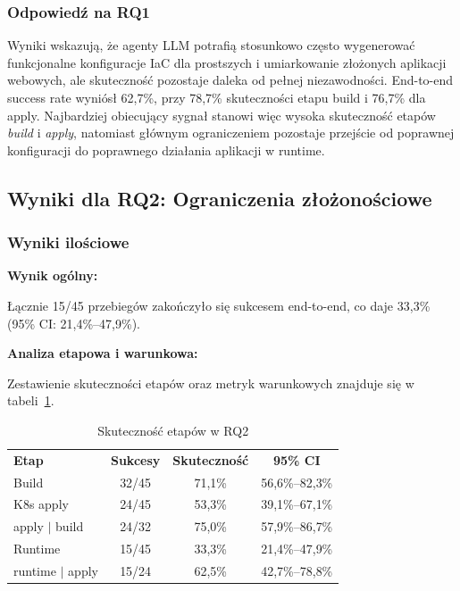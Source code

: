 \subsubsection{Odpowiedź na RQ1}

Wyniki wskazują, że agenty LLM potrafią stosunkowo często wygenerować funkcjonalne konfiguracje IaC dla prostszych i umiarkowanie złożonych aplikacji webowych, ale skuteczność pozostaje daleka od pełnej niezawodności. End-to-end success rate wyniósł 62{,}7\%, przy 78{,}7\% skuteczności etapu build i 76{,}7\% dla apply. Najbardziej obiecujący sygnał stanowi więc wysoka skuteczność etapów \textit{build} i \textit{apply}, natomiast głównym ograniczeniem pozostaje przejście od poprawnej konfiguracji do poprawnego działania aplikacji w runtime.

\subsection{Wyniki dla RQ2: Ograniczenia złożonościowe}

\subsubsection{Wyniki ilościowe}

\textbf{Wynik ogólny:}

Łącznie 15/45 przebiegów zakończyło się sukcesem end-to-end, co daje 33{,}3\% (95\% CI: 21{,}4\%--47{,}9\%).

\textbf{Analiza etapowa i warunkowa:}

Zestawienie skuteczności etapów oraz metryk warunkowych znajduje się w tabeli~\ref{tab:h2-stages}.

\begin{table}[h]
    \centering
    \begin{tabular}{lccc}
        \textbf{Etap} & \textbf{Sukcesy} & \textbf{Skuteczność} & \textbf{95\% CI} \\
        Build & 32/45 & 71{,}1\% & 56{,}6\%--82{,}3\% \\
        K8s apply & 24/45 & 53{,}3\% & 39{,}1\%--67{,}1\% \\
        apply $|$ build & 24/32 & 75{,}0\% & 57{,}9\%--86{,}7\% \\
        Runtime & 15/45 & 33{,}3\% & 21{,}4\%--47{,}9\% \\
        runtime $|$ apply & 15/24 & 62{,}5\% & 42{,}7\%--78{,}8\% \\
    \end{tabular}
    \caption{Skuteczność etapów w RQ2}
    \label{tab:h2-stages}
\end{table}

